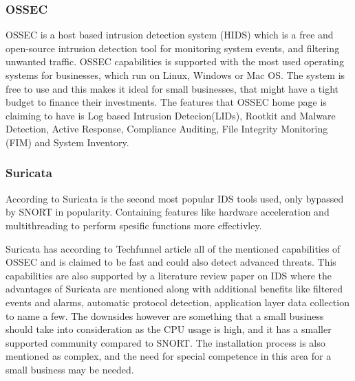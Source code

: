 
\subsubsection{OSSEC}
OSSEC is a host based intrusion detection system (HIDS) which is a free and open-source intrusion detection tool for monitoring system events, and filtering unwanted traffic. OSSEC capabilities is supported with the most used operating systems for businesses, which run on Linux, Windows or Mac OS. The system is free to use and this makes it ideal for small businesses, that might have a tight budget to finance their investments. The features that OSSEC home page \cite{SANS2011_RobertsonC} is claiming to have is Log based Intrusion Detecion(LIDs), Rootkit and Malware Detection, Active Response, Compliance Auditing, File Integrity Monitoring (FIM) and System Inventory.\\

\subsubsection{Suricata}

According to \cite{Reznik2021-mz} Suricata is the second most popular IDS tools used, only bypassed by SNORT in popularity. Containing features like hardware acceleration and multithreading to perform spesific functions more effectivley.

Suricata has according to Techfunnel article \cite{Techfunnel} all of the mentioned capabilities of OSSEC and is claimed to be fast and could also detect advanced threats. This capabilities are also supported by a literature review paper on IDS \cite{ozkan2021comprehensive} where the advantages of Suricata are mentioned along with additional benefits like filtered events and alarms, automatic protocol detection, application layer data collection to name a few. The downsides however are something that a small business should take into consideration as the CPU usage is high, and it has a smaller supported community compared to SNORT. The installation process is also mentioned as complex, and the need for special competence in this area for a small business may be needed.\\